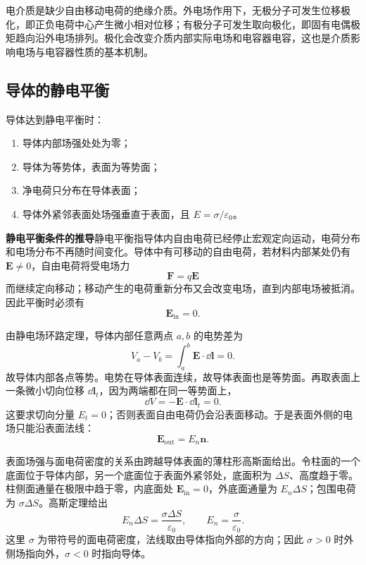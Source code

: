 \begin{attention}[电介质极化]
电介质是缺少自由移动电荷的绝缘介质。外电场作用下，无极分子可发生位移极化，即正负电荷中心产生微小相对位移；有极分子可发生取向极化，即固有电偶极矩趋向沿外电场排列。极化会改变介质内部实际电场和电容器电容，这也是介质影响电场与电容器性质的基本机制。
\end{attention}

\subsection{导体的静电平衡}

\begin{theorem}[导体静电平衡条件]\label{thm:conductor-equilibrium}
导体达到静电平衡时：
\begin{enumerate}
  \item 导体内部场强处处为零；
  \item 导体为等势体，表面为等势面；
  \item 净电荷只分布在导体表面；
  \item 导体外紧邻表面处场强垂直于表面，且 $E=\sigma/\varepsilon_0$。
\end{enumerate}
\end{theorem}

\textbf{静电平衡条件的推导}\quad 静电平衡指导体内自由电荷已经停止宏观定向运动，电荷分布和电场分布不再随时间变化。导体中有可移动的自由电荷，若材料内部某处仍有 $\bm E\ne0$，自由电荷将受电场力
\[
  \bm F=q\bm E
\]
而继续定向移动；移动产生的电荷重新分布又会改变电场，直到内部电场被抵消。因此平衡时必须有
\[
  \bm E_{\mathrm{in}}=0.
\]

由静电场环路定理，导体内部任意两点 $a,b$ 的电势差为
\[
  V_a-V_b=\int_a^b\bm E\cdot\dd\bm l=0.
\]
故导体内部各点等势。电势在导体表面连续，故导体表面也是等势面。再取表面上一条微小切向位移 $\dd\bm l_t$，因为两端都在同一等势面上，
\[
  \dd V=-\bm E\cdot\dd\bm l_t=0.
\]
这要求切向分量 $E_t=0$；否则表面自由电荷仍会沿表面移动。于是表面外侧的电场只能沿表面法线：
\[
  \bm E_{\mathrm{out}}=E_n\bm n.
\]

表面场强与面电荷密度的关系由跨越导体表面的薄柱形高斯面给出。令柱面的一个底面位于导体内部，另一个底面位于表面外紧邻处，底面积为 $\Delta S$、高度趋于零。柱侧面通量在极限中趋于零，内底面处 $\bm E_{\mathrm{in}}=0$，外底面通量为 $E_n\Delta S$；包围电荷为 $\sigma\Delta S$。高斯定理给出
\[
  E_n\Delta S=\frac{\sigma\Delta S}{\varepsilon_0},
  \qquad
  E_n=\frac{\sigma}{\varepsilon_0}.
\]
这里 $\sigma$ 为带符号的面电荷密度，法线取由导体指向外部的方向；因此 $\sigma>0$ 时外侧场指向外，$\sigma<0$ 时指向导体。

